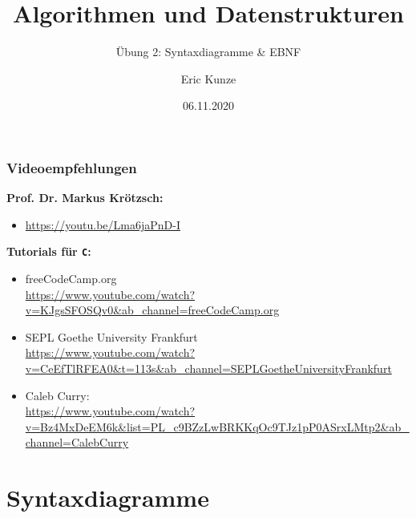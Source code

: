 \documentclass{beamer}
\begin{document}
	
	\title{Algorithmen und Datenstrukturen}
	\subtitle{Übung 2: Syntaxdiagramme \& EBNF}
	\author{Eric Kunze}
	\date{06.11.2020}

	\maketitle



\begin{frame} \frametitle{Videoempfehlungen}
	
	\textbf{Prof. Dr. Markus Krötzsch:}
	\begin{itemize}
		\item  \url{https://youtu.be/Lma6jaPnD-I}
	\end{itemize}	
	
	\pause\bigskip
		
	\textbf{Tutorials für \texttt{C}:}
	\begin{itemize}
		\item freeCodeCamp.org \\
		\url{https://www.youtube.com/watch?v=KJgsSFOSQv0&ab_channel=freeCodeCamp.org}
		\item SEPL Goethe University Frankfurt \\
		\url{https://www.youtube.com/watch?v=CeEfTlRFEA0&t=113s&ab_channel=SEPLGoetheUniversityFrankfurt}
		\item Caleb Curry: \\
		\url{https://www.youtube.com/watch?v=Bz4MxDeEM6k&list=PL_c9BZzLwBRKKqOc9TJz1pP0ASrxLMtp2&ab_channel=CalebCurry}
	\end{itemize}
\end{frame}

\section{Syntaxdiagramme}
\end{document}
